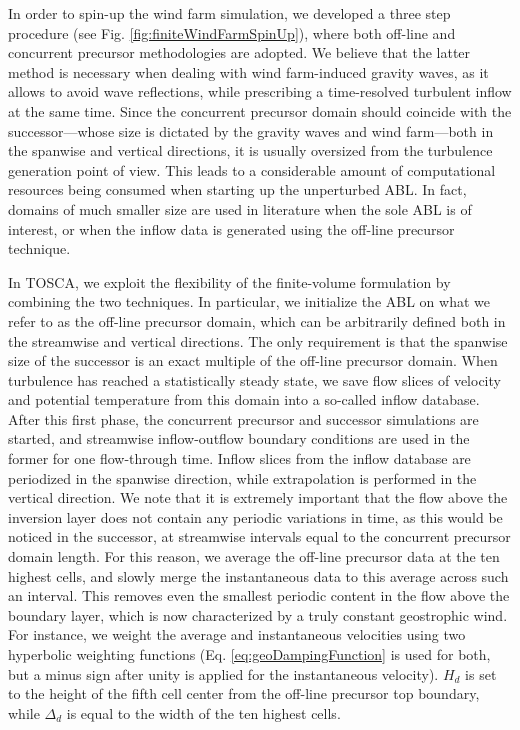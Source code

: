 \documentclass[journal abbreviation, manuscript]{copernicus}
\begin{document}
In order to spin-up the wind farm simulation, we developed a three step procedure (see Fig. \ref{fig:finiteWindFarmSpinUp}), where both off-line and concurrent precursor methodologies are adopted. We believe that the latter method is necessary when dealing with wind farm-induced gravity waves, as it allows to avoid wave reflections, while prescribing a time-resolved turbulent inflow at the same time. Since the concurrent precursor domain should coincide with the successor---whose size is dictated by the gravity waves and wind farm---both in the spanwise and vertical directions, it is usually oversized from the turbulence generation point of view. This leads to a considerable amount of computational resources being consumed when starting up the unperturbed ABL. In fact, domains of much smaller size are used in literature when the sole ABL is of interest, or when the inflow data is generated using the off-line precursor technique. 

In TOSCA, we exploit the flexibility of the finite-volume formulation by combining the two techniques. In particular, we initialize the ABL on what we refer to as the off-line precursor domain, which can be arbitrarily defined both in the streamwise and vertical directions. The only requirement is that the spanwise size of the successor is an exact multiple of the off-line precursor domain. When turbulence has reached a statistically steady state, we save flow slices of velocity and potential temperature from this domain into a so-called inflow database. After this first phase, the concurrent precursor and successor simulations are started, and streamwise inflow-outflow boundary conditions are used in the former for one flow-through time. Inflow slices from the inflow database are periodized in the spanwise direction, while extrapolation is performed in the vertical direction. We note that it is extremely important that the flow above the inversion layer does not contain any periodic variations in time, as this would be noticed in the successor, at streamwise intervals equal to the concurrent precursor domain length. For this reason, we average the off-line precursor data at the ten highest cells, and slowly merge the instantaneous data to this average across such an interval. This removes even the smallest periodic content in the flow above the boundary layer, which is now characterized by a truly constant geostrophic wind. For instance, we weight the average and instantaneous velocities using two hyperbolic weighting functions (Eq. \ref{eq:geoDampingFunction} is used for both, but a minus sign after unity is applied for the instantaneous velocity). $H_d$ is set to the height of the fifth cell center from the off-line precursor top boundary, while $\Delta_d$ is equal to the width of the ten highest cells. 
\end{document}

